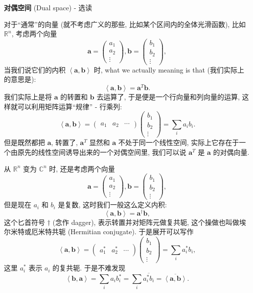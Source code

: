 \begin{newquote}
\textbf{对偶空间} (Dual space) - 选读

对于``通常''的向量 (就不考虑广义的那些, 比如某个区间内的全体光滑函数),
比如 \(\mathbb{R}^n\), 考虑两个向量 \[
\boldsymbol{a}=\begin{pmatrix}a_1\\a_2\\\vdots\end{pmatrix},\boldsymbol{b}=\begin{pmatrix}b_1\\b_2\\\vdots\end{pmatrix},
\] 当我们说它们的内积 \(\left<\boldsymbol{a},\boldsymbol{b}\right>\) 时,
what we actually meaning is that (我们实际上的意思是): \[
\left<\boldsymbol{a},\boldsymbol{b}\right>=\boldsymbol{a}^T\boldsymbol{b}.
\] 我们实际上是将 \(\boldsymbol{a}\) 的转置和 \(\boldsymbol{b}\)
去运算了, 于是便是一个行向量和列向量的运算,
这样就可以利用矩阵运算``规律'' - 行乘列: \[
\left<\boldsymbol{a},\boldsymbol{b}\right>=\begin{pmatrix}a_1&a_2&\cdots\end{pmatrix}\begin{pmatrix}b_1\\b_2\\\vdots\end{pmatrix}=\sum_ia_ib_i.
\] 但是既然都把 \(\boldsymbol{a}\), 转置了, \(\boldsymbol{a}^T\) 显然和
\(\boldsymbol{a}\) 不处于同一个线性空间,
实际上它存在于一个由原先的线性空间诱导出来的一个对偶空间里, 我们可以说
\(\boldsymbol{a}^T\) 是 \(\boldsymbol{a}\) 的对偶向量.

从 \(\mathbb{R}^n\) 变为 \(\mathbb{C}^n\) 时, 还是考虑两个向量 \[
\boldsymbol{a}=\begin{pmatrix}a_1\\a_2\\\vdots\end{pmatrix},\boldsymbol{b}=\begin{pmatrix}b_1\\b_2\\\vdots\end{pmatrix},
\] 但是现在 \(a_i\) 和 \(b_i\) 是复数, 这时我们一般这么定义内积: \[
\left<\boldsymbol{a},\boldsymbol{b}\right>=\boldsymbol{a}^\dagger\boldsymbol{b},
\] 这个匕首符号 \(\dagger\) (念作 dagger), 表示转置并对矩阵元做复共轭,
这个操做也叫做埃尔米特或厄米特共轭 (Hermitian conjugate).
于是展开可以写作 \[
\left<\boldsymbol{a},\boldsymbol{b}\right>=\begin{pmatrix}a_1^*&a_2^*&\cdots\end{pmatrix}\begin{pmatrix}b_1\\b_2\\\vdots\end{pmatrix}=\sum_ia_i^*b_i,
\] 这里 \(a_i^*\) 表示 \(a_i\) 的复共轭. 于是不难发现 \[
\left<\boldsymbol{b},\boldsymbol{a}\right>=\sum_ia_ib_i^*=\sum_i\overline{a_i^*b_i}=\overline{\left<\boldsymbol{a},\boldsymbol{b}\right>}.
\]
\end{newquote}

